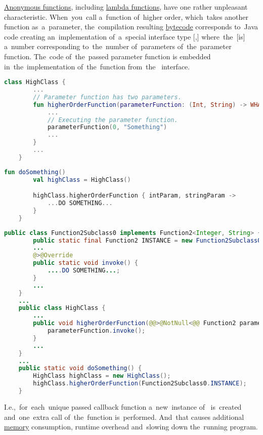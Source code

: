 \hyperref[kotlinanonymousfunction]{Anonymous functions}, including \hyperref[kotlinlambda]{lambda functions}, have one rather unpleasant characteristic.
When~you~call a~function of~higher order, which~takes another function as~a~parameter, the~compilation resulting \hyperref[javabytecode]{bytecode} corresponds to~Java code creating an~implementation of~a~special interface type [,] where~the~[is] a~number corresponding to~the~number of~parameters of~the~parameter function.
The~code of~the~passed parameter function is embedded in~the~implementation of~the~function  from~the~ interface.

\example
\begin{lstlisting}[language=Kotlin, title={Function of higher order}]
    class HighClass {
        ...
        // Parameter function has two parameters.
        fun higherOrderFunction(parameterFunction: (Int, String) -> WHATEVER) {
            ...
            // Executing the parameter function.
            parameterFunction(0, "Something")
            ...
        }
        ...
    }
\end{lstlisting}
\begin{lstlisting}[language=Kotlin, title={Calling the~function of higher order}]
    fun doSomething()
        val highClass = HighClass()

        highClass.higherOrderFunction { intParam, stringParam ->
            ...DO SOMETHING...
        }
    }
\end{lstlisting}
\begin{lstlisting}[language=Java, title={Rough Java equivalent of the generated bytecode}]
    public class Function2Subclass0 implements Function2<Integer, String> {
        public static final Function2 INSTANCE = new Function2Subclass0(0, "Something");
        ...
        @>@Override
        public static void invoke() {
            ....DO SOMETHING...;
        }
        ...
    }
    ...
    public class HighClass {
        ...
        public void higherOrderFunction(@@>@NotNull<@@ Function2 parameterFunction) {
            parameterFunction.invoke();
        }
        ...
    }
    ...
    public static void doSomething() {
        HighClass highClass = new HighClass();
        highClass.higherOrderFunction(Function2Subclass0.INSTANCE);
    }
\end{lstlisting}

\noindent I.e.,~for~each~unique passed callback function a~new~instance of~ is~created and~one~extra call of~the~function  is~performed.
And~that causes additional \hyperref[systemmemory]{memory} consumption, runtime overhead and~slowing down the~running program.

